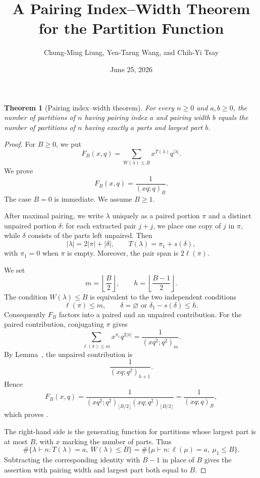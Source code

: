 \documentclass[11pt]{article}
\title{A Pairing Index--Width Theorem for the Partition Function}
\author{Chung-Ming Liung, Yen-Tarng Wang, and Chih-Yi Tsay}
\date{June 25, 2026}
\newtheorem{theorem}{Theorem}[section]
\begin{document}
\begin{theorem}[Pairing index--width theorem]\label{thm:pairing-index-width}
For every $n\ge0$ and $a,b\ge0$, the number of partitions of $n$ having pairing index $a$ and pairing width $b$ equals the number of partitions of $n$ having exactly $a$ parts and largest part $b$.
\end{theorem}

\begin{proof}
For $B\ge0$, we put
\[
        F_B(x,q)=\sum_{W(\lambda)\le B}x^{T(\lambda)}q^{|\lambda|}.
\]
We prove
\begin{equation}\label{eq:pairing-index-width}
        F_B(x,q)=\frac{1}{(xq;q)_B}.
\end{equation}
The case $B=0$ is immediate.  We assume $B\ge1$.

After maximal pairing, we write $\lambda$ uniquely as a paired portion $\pi$ and a distinct unpaired portion $\delta$: for each extracted pair $j+j$, we place one copy of $j$ in $\pi$, while $\delta$ consists of the parts left unpaired.  Then
\[
        |\lambda|=2|\pi|+|\delta|,
        \qquad
        T(\lambda)=\pi_1+s(\delta),
\]
with $\pi_1=0$ when $\pi$ is empty.  Moreover, the pair span is $2\ell(\pi)$.

We set
\[
        m=\left\lfloor\frac{B}{2}\right\rfloor,
        \qquad
        h=\left\lfloor\frac{B-1}{2}\right\rfloor.
\]
The condition $W(\lambda)\le B$ is equivalent to the two independent conditions
\[
        \ell(\pi)\le m,
        \qquad
        \delta=\varnothing \text{ or } \delta_1-s(\delta)\le h.
\]
Consequently $F_B$ factors into a paired and an unpaired contribution.  For the paired contribution, conjugating $\pi$ gives
\[
        \sum_{\ell(\pi)\le m}x^{\pi_1}q^{2|\pi|}
        =\frac{1}{(xq^2;q^2)_m}.
\]
By Lemma~, the unpaired contribution is
\[
        \frac{1}{(xq;q^2)_{h+1}}.
\]
Hence
\[
        F_B(x,q)
        =\frac{1}{(xq^2;q^2)_{\lfloor B/2\rfloor}(xq;q^2)_{\lfloor B/2\rfloor}}
        =\frac{1}{(xq;q)_B},
\]
which proves .

The right-hand side is the generating function for partitions whose largest part is at most $B$, with $x$ marking the number of parts.  Thus
\[
        \#\{\lambda\vdash n:T(\lambda)=a,\ W(\lambda)\le B\}
        =\#\{\mu\vdash n:\ell(\mu)=a,\ \mu_1\le B\}.
\]
Subtracting the corresponding identity with $B-1$ in place of $B$ gives the assertion with pairing width and largest part both equal to $B$.
\end{proof}
\end{document}
